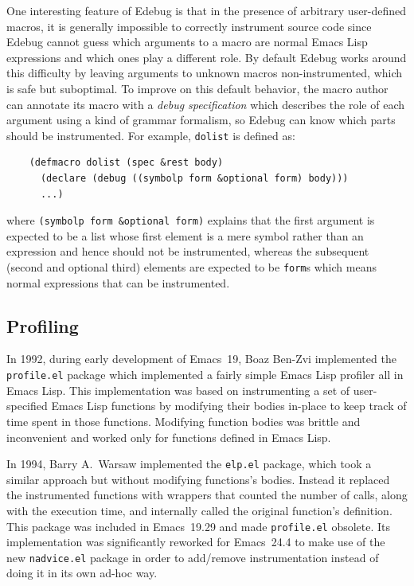 \documentclass[format=acmsmall,screen]{acmart}
\newcommand \Elisp {Emacs Lisp}
\begin{document}
One interesting feature of Edebug is that in the presence of arbitrary
user-defined macros, it is generally impossible to correctly instrument
source code since Edebug cannot guess which arguments to a macro are normal
\Elisp{} expressions and which ones play a different role.  By default
Edebug works around this difficulty by leaving arguments to unknown macros
non-instrumented, which is safe but suboptimal.  To improve on this default
behavior, the macro author can annotate its macro with a \emph{debug
  specification} which describes the role of each argument using a kind of
grammar formalism, so Edebug can know which parts should be
instrumented.  For example, \texttt{dolist} is defined as:
\begin{verbatim}
    (defmacro dolist (spec &rest body)
      (declare (debug ((symbolp form &optional form) body)))
      ...)
\end{verbatim}
where \texttt{(symbolp form \&optional form)} explains that the first
argument is expected to be a list whose first element is a mere symbol
rather than an expression and hence should not be instrumented, whereas the
subsequent (second and optional third) elements are expected to be
\texttt{form}s which means normal expressions that can be instrumented.

\subsection{Profiling}
\label{sec:profiler}

In 1992, during early development of Emacs~19, Boaz Ben-Zvi implemented the
\texttt{profile.el} package which implemented a fairly simple \Elisp{}
profiler all in \Elisp{}.  This implementation was based on instrumenting
a set of user-specified \Elisp{} functions by modifying their bodies in-place
to keep track of time spent in those functions. Modifying function
bodies was brittle and inconvenient and worked only for functions
defined in \Elisp.

In 1994, Barry A.~Warsaw implemented the \texttt{elp.el} package, which took
a similar approach but without modifying functions's bodies.
Instead it replaced the instrumented functions with wrappers that counted
the number of calls, along with the execution time, and internally called
the original function's definition.  This package was included in
Emacs~19.29 and made \texttt{profile.el} obsolete.  Its implementation was
significantly reworked for Emacs~24.4 to make use of the new
\texttt{nadvice.el} package in order to add/remove instrumentation instead
of doing it in its own ad-hoc way.
\end{document}
